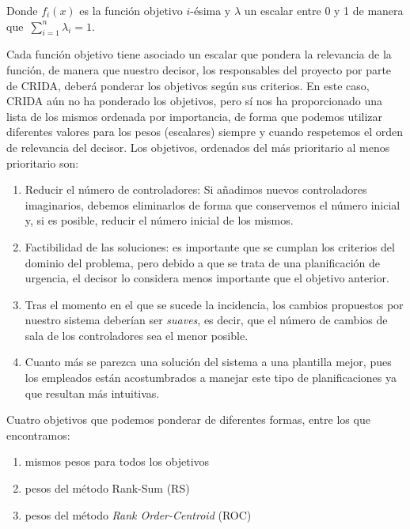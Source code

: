 Donde $f_i(x)$ es la función objetivo $i$-ésima y $\lambda$ un escalar entre 0 y 1 de manera que~$\sum_{i=1}^n \lambda_i = 1$.

Cada función objetivo tiene asociado un escalar que pondera la relevancia de la función, de manera que nuestro decisor, los responsables del proyecto por parte de \gls{CRIDA}, deberá ponderar los objetivos según sus criterios. En este caso, CRIDA aún no ha ponderado los objetivos, pero sí nos ha proporcionado una lista de los mismos ordenada por importancia, de forma que podemos utilizar diferentes valores para los pesos (escalares) siempre y cuando respetemos el orden de relevancia del decisor. Los objetivos, ordenados del más prioritario al menos prioritario son:

\begin{enumerate}[label={O\arabic*}]
    \item \label{O1} Reducir el número de controladores: Si añadimos nuevos controladores imaginarios, debemos eliminarlos de forma que conservemos el número inicial y, si es posible, reducir el número inicial de los mismos.

    \item \label{O2} Factibilidad de las soluciones: es importante que se cumplan los criterios del dominio del problema, pero debido a que se trata de una planificación de urgencia, el decisor lo considera menos importante que el objetivo anterior.

    \item \label{O3} Tras el momento en el que se sucede la incidencia, los cambios propuestos por nuestro sistema deberían ser \textit{suaves}, es decir, que el número de cambios de sala de los controladores sea el menor posible.

    \item \label{O4} Cuanto más se parezca una solución del sistema a una plantilla mejor, pues los empleados están acostumbrados a manejar este tipo de planificaciones ya que resultan más intuitivas.
\end{enumerate}

\begin{minipage}{\textwidth}
    Cuatro objetivos que podemos ponderar de diferentes formas, entre los que encontramos:
    \begin{enumerate}[label=\alph*)]
        \item mismos pesos para todos los objetivos
        \item pesos del método Rank-Sum (RS)
        \item pesos del método \textit{Rank Order-Centroid} (ROC)
    \end{enumerate}
\end{minipage}


